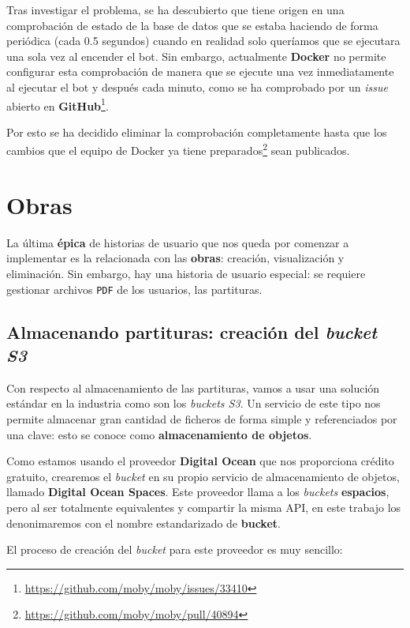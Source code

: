 Tras investigar el problema, se ha descubierto que tiene origen en una comprobación de estado de la base de datos que se estaba haciendo de forma periódica (cada 0.5 segundos) cuando en realidad solo queríamos que se ejecutara una sola vez al encender el bot. Sin embargo, actualmente \textbf{Docker} no permite configurar esta comprobación de manera que se ejecute una vez inmediatamente al ejecutar el bot y después cada minuto, como se ha comprobado por un \textit{issue} abierto en \textbf{GitHub}\footnote{\url{https://github.com/moby/moby/issues/33410}}.

Por esto se ha decidido eliminar la comprobación completamente hasta que los cambios que el equipo de Docker ya tiene preparados\footnote{\url{https://github.com/moby/moby/pull/40894}} sean publicados.

\section{Obras}

La última \textbf{épica} de historias de usuario que nos queda por comenzar a implementar es la relacionada con las \textbf{obras}: creación, visualización y eliminación. Sin embargo, hay una historia de usuario especial: se requiere gestionar archivos \texttt{PDF} de los usuarios, las partituras.


\subsection{Almacenando partituras: creación del \textit{bucket S3}}\label{subsection:crearBucket}

Con respecto al almacenamiento de las partituras, vamos a usar una solución estándar en la industria como son los \textit{buckets S3}. Un servicio de este tipo nos permite almacenar gran cantidad de ficheros de forma simple y referenciados por una clave: esto se conoce como \textbf{almacenamiento de objetos}. 

Como estamos usando el proveedor \textbf{Digital Ocean} que nos proporciona crédito gratuito, crearemos el \textit{bucket} en su propio servicio de almacenamiento de objetos, llamado \textbf{Digital Ocean Spaces}. Este proveedor llama a los \textit{buckets} \textbf{espacios}, pero al ser totalmente equivalentes y compartir la misma API, en este trabajo los denonimaremos con el nombre estandarizado de \textbf{bucket}.

El proceso de creación del \textit{bucket} para este proveedor es muy sencillo:

